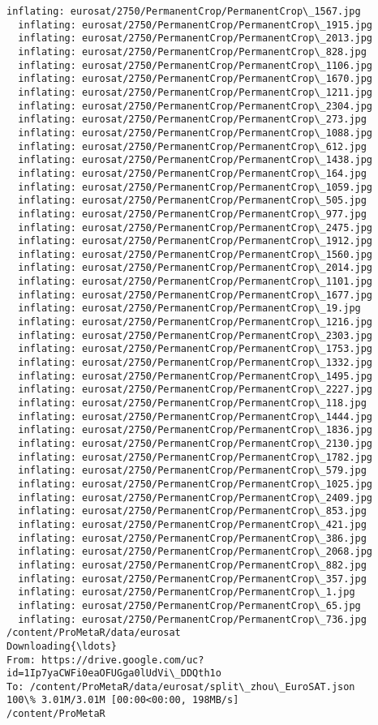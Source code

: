 \documentclass[11pt]{article}
\begin{document}
\begin{Verbatim}[commandchars=\\\{\}]
  inflating: eurosat/2750/PermanentCrop/PermanentCrop\_1567.jpg
  inflating: eurosat/2750/PermanentCrop/PermanentCrop\_1915.jpg
  inflating: eurosat/2750/PermanentCrop/PermanentCrop\_2013.jpg
  inflating: eurosat/2750/PermanentCrop/PermanentCrop\_828.jpg
  inflating: eurosat/2750/PermanentCrop/PermanentCrop\_1106.jpg
  inflating: eurosat/2750/PermanentCrop/PermanentCrop\_1670.jpg
  inflating: eurosat/2750/PermanentCrop/PermanentCrop\_1211.jpg
  inflating: eurosat/2750/PermanentCrop/PermanentCrop\_2304.jpg
  inflating: eurosat/2750/PermanentCrop/PermanentCrop\_273.jpg
  inflating: eurosat/2750/PermanentCrop/PermanentCrop\_1088.jpg
  inflating: eurosat/2750/PermanentCrop/PermanentCrop\_612.jpg
  inflating: eurosat/2750/PermanentCrop/PermanentCrop\_1438.jpg
  inflating: eurosat/2750/PermanentCrop/PermanentCrop\_164.jpg
  inflating: eurosat/2750/PermanentCrop/PermanentCrop\_1059.jpg
  inflating: eurosat/2750/PermanentCrop/PermanentCrop\_505.jpg
  inflating: eurosat/2750/PermanentCrop/PermanentCrop\_977.jpg
  inflating: eurosat/2750/PermanentCrop/PermanentCrop\_2475.jpg
  inflating: eurosat/2750/PermanentCrop/PermanentCrop\_1912.jpg
  inflating: eurosat/2750/PermanentCrop/PermanentCrop\_1560.jpg
  inflating: eurosat/2750/PermanentCrop/PermanentCrop\_2014.jpg
  inflating: eurosat/2750/PermanentCrop/PermanentCrop\_1101.jpg
  inflating: eurosat/2750/PermanentCrop/PermanentCrop\_1677.jpg
  inflating: eurosat/2750/PermanentCrop/PermanentCrop\_19.jpg
  inflating: eurosat/2750/PermanentCrop/PermanentCrop\_1216.jpg
  inflating: eurosat/2750/PermanentCrop/PermanentCrop\_2303.jpg
  inflating: eurosat/2750/PermanentCrop/PermanentCrop\_1753.jpg
  inflating: eurosat/2750/PermanentCrop/PermanentCrop\_1332.jpg
  inflating: eurosat/2750/PermanentCrop/PermanentCrop\_1495.jpg
  inflating: eurosat/2750/PermanentCrop/PermanentCrop\_2227.jpg
  inflating: eurosat/2750/PermanentCrop/PermanentCrop\_118.jpg
  inflating: eurosat/2750/PermanentCrop/PermanentCrop\_1444.jpg
  inflating: eurosat/2750/PermanentCrop/PermanentCrop\_1836.jpg
  inflating: eurosat/2750/PermanentCrop/PermanentCrop\_2130.jpg
  inflating: eurosat/2750/PermanentCrop/PermanentCrop\_1782.jpg
  inflating: eurosat/2750/PermanentCrop/PermanentCrop\_579.jpg
  inflating: eurosat/2750/PermanentCrop/PermanentCrop\_1025.jpg
  inflating: eurosat/2750/PermanentCrop/PermanentCrop\_2409.jpg
  inflating: eurosat/2750/PermanentCrop/PermanentCrop\_853.jpg
  inflating: eurosat/2750/PermanentCrop/PermanentCrop\_421.jpg
  inflating: eurosat/2750/PermanentCrop/PermanentCrop\_386.jpg
  inflating: eurosat/2750/PermanentCrop/PermanentCrop\_2068.jpg
  inflating: eurosat/2750/PermanentCrop/PermanentCrop\_882.jpg
  inflating: eurosat/2750/PermanentCrop/PermanentCrop\_357.jpg
  inflating: eurosat/2750/PermanentCrop/PermanentCrop\_1.jpg
  inflating: eurosat/2750/PermanentCrop/PermanentCrop\_65.jpg
  inflating: eurosat/2750/PermanentCrop/PermanentCrop\_736.jpg
/content/ProMetaR/data/eurosat
Downloading{\ldots}
From: https://drive.google.com/uc?id=1Ip7yaCWFi0eaOFUGga0lUdVi\_DDQth1o
To: /content/ProMetaR/data/eurosat/split\_zhou\_EuroSAT.json
100\% 3.01M/3.01M [00:00<00:00, 198MB/s]
/content/ProMetaR
    \end{Verbatim}
\end{document}
